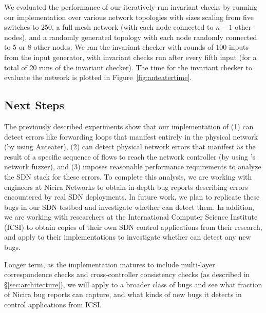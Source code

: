    We evaluated the performance of our iteratively run invariant checks by running our implementation over various network topologies with sizes scaling from five switches to 250, a full mesh network (with each node connected to $n - 1$ other nodes), and a randomly generated topology with each node randomly connected to 5 or 8 other nodes.
    We ran the invariant checker with rounds of 100 inputs from the input generator, with invariant checks run after every fifth input (for a total of 20 runs of the invariant checker).
    The time for the invariant checker to evaluate the network is plotted in Figure~\ref{fig:anteatertime}.
   

    \subsection{Next Steps}
        The previously described experiments show that our implementation of \projectname{} (1) can detect errors like forwarding loops that manifest entirely in the physical network (by using Anteater), (2) can detect physical network errors that manifest as the result of a specific sequence of flows to reach the network controller (by using \projectname{}'s network fuzzer), and (3) imposes reasonable performance requirements to analyze the SDN stack for these errors.
        To complete this analysis, we are working with engineers at Nicira Networks to obtain in-depth bug reports describing errors encountered by real SDN deployments.
        In future work, we plan to replicate these bugs in our SDN testbed and investigate whether \projectname{} can detect them.
        In addition, we are working with researchers at the International Computer Science Institute (ICSI) to obtain copies of their own SDN control applications from their research, and apply \projectname{} to their implementations to investigate whether \projectname{} can detect any new bugs.

        Longer term, as the \projectname{} implementation matures to include multi-layer correspondence checks and cross-controller consistency checks (as described in \S\ref{sec:architecture}), we will apply \projectname{} to a broader class of bugs and see what fraction of Nicira bug reports \projectname{} can capture, and what kinds of new bugs it detects in control applications from ICSI. 


